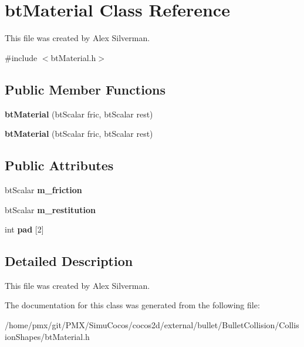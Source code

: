 \hypertarget{classbtMaterial}{}\section{bt\+Material Class Reference}
\label{classbtMaterial}


This file was created by Alex Silverman.  




{\ttfamily \#include $<$bt\+Material.\+h$>$}

\subsection*{Public Member Functions}
\begin{DoxyCompactItemize}
\item 
\mbox{\label{classbtMaterial_a5560dbe9cbe62d3208918d60ffadc6ef}} 
{\bfseries bt\+Material} (bt\+Scalar fric, bt\+Scalar rest)
\item 
\mbox{\label{classbtMaterial_a5560dbe9cbe62d3208918d60ffadc6ef}} 
{\bfseries bt\+Material} (bt\+Scalar fric, bt\+Scalar rest)
\end{DoxyCompactItemize}
\subsection*{Public Attributes}
\begin{DoxyCompactItemize}
\item 
\mbox{\label{classbtMaterial_a7b89ad70b06e291edc936e761372d7d2}} 
bt\+Scalar {\bfseries m\+\_\+friction}
\item 
\mbox{\label{classbtMaterial_a6fe1c9b899fa7aaaf2abd134555604f1}} 
bt\+Scalar {\bfseries m\+\_\+restitution}
\item 
\mbox{\label{classbtMaterial_a9fa1d12fe303c2e852743f10a13db9c6}} 
int {\bfseries pad} \mbox{[}2\mbox{]}
\end{DoxyCompactItemize}


\subsection{Detailed Description}
This file was created by Alex Silverman. 

The documentation for this class was generated from the following file\+:\begin{DoxyCompactItemize}
\item 
/home/pmx/git/\+P\+M\+X/\+Simu\+Cocos/cocos2d/external/bullet/\+Bullet\+Collision/\+Collision\+Shapes/bt\+Material.\+h\end{DoxyCompactItemize}
